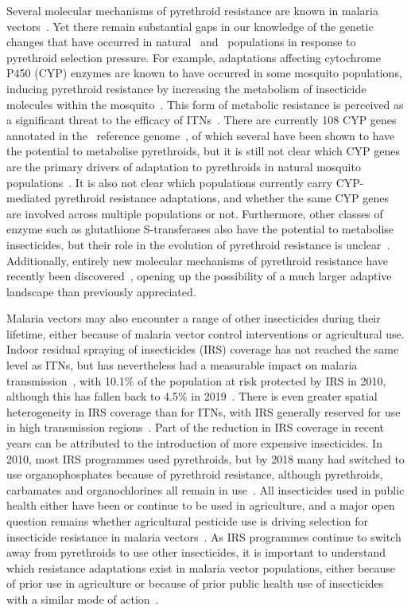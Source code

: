 \documentclass[a4paper,11pt,abstracton,hidelinks]{scrartcl}
\begin{document}
Several molecular mechanisms of pyrethroid resistance are known in malaria vectors~\parencite{Hemingway2016}.
%
Yet there remain substantial gaps in our knowledge of the genetic changes that have occurred in natural \agam\ and \acol\ populations in response to pyrethroid selection pressure.
%
For example, adaptations affecting cytochrome P450 (CYP) enzymes are known to have occurred in some mosquito populations, inducing pyrethroid resistance by increasing the metabolism of insecticide molecules within the mosquito~\parencite{Ranson2016,Hemingway2016}.
%
This form of metabolic resistance is perceived as a significant threat to the efficacy of ITNs~\parencite{Churcher2016,WHO2017PBOLLIN}.
%
There are currently 108 CYP genes annotated in the \agam\ reference genome~\parencite{GiraldoCalderon2015,AgamP4.12}, of which several have been shown to have the potential to metabolise pyrethroids, but it is still not clear which CYP genes are the primary drivers of adaptation to pyrethroids in natural mosquito populations~\parencite{Mohammed2017}.
%
It is also not clear which populations currently carry CYP-mediated pyrethroid resistance adaptations, and whether the same CYP genes are involved across multiple populations or not.
%
Furthermore, other classes of enzyme such as glutathione S-transferases also have the potential to metabolise insecticides, but their role in the evolution of pyrethroid resistance is unclear~\parencite{Adolfi2019}.
%
Additionally, entirely new molecular mechanisms of pyrethroid resistance have recently been discovered~\parencite{Ingham2020}, opening up the possibility of a much larger adaptive landscape than previously appreciated.


Malaria vectors may also encounter a range of other insecticides during their lifetime, either because of malaria vector control interventions or agricultural use.
%
Indoor residual spraying of insecticides (IRS) coverage has not reached the same level as ITNs, but has nevertheless had a measurable impact on malaria transmission~\parencite{Bhatt2015}, with 10.1\% of the population at risk protected by IRS in 2010, although this has fallen back to 4.5\% in 2019~\parencite{WHO2019WMR}.
%
There is even greater spatial heterogeneity in IRS coverage than for ITNs, with IRS generally reserved for use in high transmission regions~\parencite{WHO2019WMR}.
%
Part of the reduction in IRS coverage in recent years can be attributed to the introduction of more expensive insecticides.
%
In 2010, most IRS programmes used pyrethroids, but by 2018 many had switched to use organophosphates because of pyrethroid resistance, although pyrethroids, carbamates and organochlorines all remain in use~\parencite{WHO2019WMR}.
%
All insecticides used in public health either have been or continue to be used in agriculture, and a major open question remains whether agricultural pesticide use is driving selection for insecticide resistance in malaria vectors~\parencite{Georghiou1990,Nkya2013,Philbert2014,Reid2016}.
%
As IRS programmes continue to switch away from pyrethroids to use other insecticides, it is important to understand which resistance adaptations exist in malaria vector populations, either because of prior use in agriculture or because of prior public health use of insecticides with a similar mode of action~\parencite{Fouet2020}.
\end{document}
